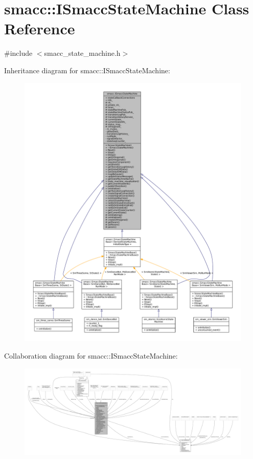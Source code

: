 \hypertarget{classsmacc_1_1ISmaccStateMachine}{}\section{smacc\+:\+:I\+Smacc\+State\+Machine Class Reference}
\label{classsmacc_1_1ISmaccStateMachine}


{\ttfamily \#include $<$smacc\+\_\+state\+\_\+machine.\+h$>$}



Inheritance diagram for smacc\+:\+:I\+Smacc\+State\+Machine\+:
\nopagebreak
\begin{figure}[H]
\begin{center}
\leavevmode
\includegraphics[width=350pt]{classsmacc_1_1ISmaccStateMachine__inherit__graph}
\end{center}
\end{figure}


Collaboration diagram for smacc\+:\+:I\+Smacc\+State\+Machine\+:
\nopagebreak
\begin{figure}[H]
\begin{center}
\leavevmode
\includegraphics[width=350pt]{classsmacc_1_1ISmaccStateMachine__coll__graph}
\end{center}
\end{figure}
